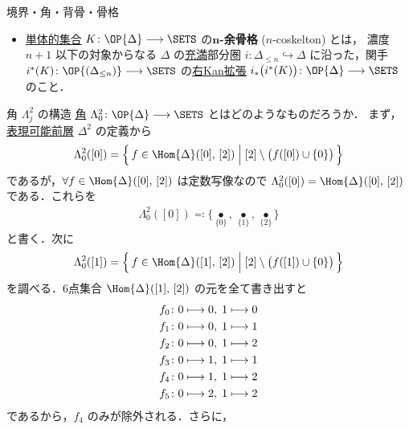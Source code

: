 \documentclass[TQFT_main]{subfiles}
\begin{document}
\begin{mydef}[label=def:horn,breakable]{境界・角・背骨・骨格}
\begin{itemize}
        \item \hyperref[def:SimpSet]{単体的集合} $K \colon \OP{\Delta} \lto \SETS$ の\textbf{$\bm{n}$-余骨格} ($n$-coskelton) とは，
        濃度 $n+1$ 以下の対象からなる $\Delta$ の\hyperref[def:faithful]{充満}部分圏 $i \colon \Delta_{\le n} \hookrightarrow \Delta$ に沿った，関手 $i^*(K) \colon \OP{(\Delta_{\le n})} \lto \SETS$ の\hyperref[def:Kanext]{右Kan拡張} $i_* \bigl(i^* (K)\bigr) \colon \OP{\Delta} \lto \SETS$ のこと．
    \end{itemize}
    
\end{mydef}

\begin{myexample}[label=ex:horn]{角 $\Lambda^2_j$ の構造}
    \hyperref[def:horn]{角} $\Lambda^2_0 \colon \OP{\Delta} \lto \SETS$ とはどのようなものだろうか．
    まず，\hyperref[def:representable]{表現可能前層} $\Delta^2$ の定義から
    \begin{align}
        \Lambda^2_0([0]) = \Bigl\{\, f \in \Hom{\Delta} ([0],\, [2]) \Bigm| [2] \setminus \bigl( f([0]) \cup \{0\}\bigr)  \,\Bigr\} 
    \end{align}
    であるが，$\forall f \in \Hom{\Delta} ([0],\, [2])$ は定数写像なので $\Lambda^2_0([0]) = \Hom{\Delta} ([0],\, [2])$ である．これらを
    \begin{align}
        \Lambda^2_0 ([0]) \eqqcolon \bigl\{ \underset{\{0\}}{\bullet},\, \underset{\{1\}}{\bullet},\, \underset{\{2\}}{\bullet} \bigr\}
    \end{align}
    と書く．次に
    \begin{align}
        \Lambda^2_0([1]) = \Bigl\{\, f \in \Hom{\Delta} ([1],\, [2]) \Bigm| [2] \setminus \bigl( f([1]) \cup \{0\}\bigr)  \,\Bigr\} 
    \end{align}
    を調べる．6点集合 $\Hom{\Delta} ([1],\, [2])$ の元を全て書き出すと
    \begin{align}
        f_0 \colon 0 &\longmapsto 0,\; 1 \longmapsto 0 \\
        f_1 \colon 0 &\longmapsto 0,\; 1 \longmapsto 1 \\
        f_2 \colon 0 &\longmapsto 0,\; 1 \longmapsto 2 \\
        f_3 \colon 0 &\longmapsto 1,\; 1 \longmapsto 1 \\
        f_4 \colon 0 &\longmapsto 1,\; 1 \longmapsto 2 \\
        f_5 \colon 0 &\longmapsto 2,\; 1 \longmapsto 2
    \end{align}
    であるから，$f_4$ のみが除外される．さらに，
    \begin{align}

\end{align}
\end{myexample}
\end{document}
